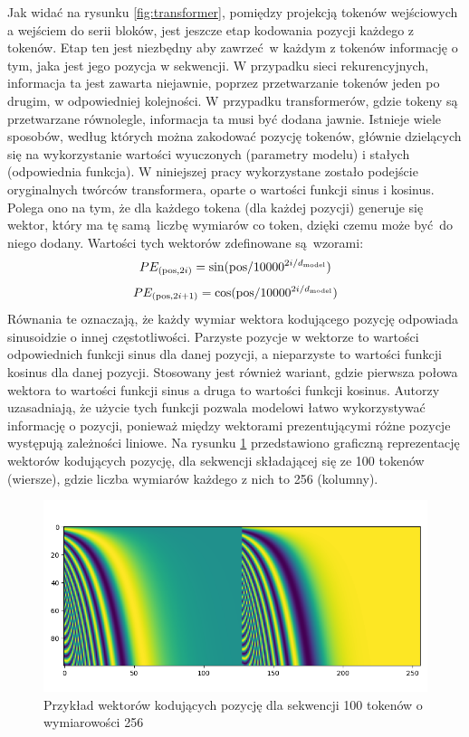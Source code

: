 Jak widać na rysunku \ref{fig:transformer}, pomiędzy projekcją tokenów wejściowych a wejściem do
serii bloków, jest jeszcze etap kodowania pozycji każdego z tokenów. Etap ten jest niezbędny aby
zawrzeć w każdym z tokenów informację o tym, jaka jest jego pozycja w sekwencji. W przypadku sieci
rekurencyjnych, informacja ta jest zawarta niejawnie, poprzez przetwarzanie tokenów jeden po drugim,
w odpowiedniej kolejności. W przypadku transformerów, gdzie tokeny są przetwarzane równolegle,
informacja ta musi być dodana jawnie.  Istnieje wiele sposobów, według których można zakodować
pozycję tokenów, głównie dzielących się na wykorzystanie wartości wyuczonych (parametry modelu) i
stałych (odpowiednia funkcja).  W niniejszej pracy wykorzystane zostało podejście oryginalnych
twórców transformera, oparte o wartości funkcji sinus i kosinus. Polega ono na tym, że dla każdego
tokena (dla każdej pozycji) generuje się wektor, który ma tę samą liczbę wymiarów co token, dzięki
czemu może być do niego dodany. Wartości tych wektorów zdefinowane są wzorami:
\begin{equation}
    PE_{(\textrm{pos},2i)} = \sin(\textrm{pos}/10000^{2i/d_{\textrm{\tiny model}}})
\end{equation}
\begin{equation}
PE_{(\textrm{pos},2i + 1)} = \cos(\textrm{pos}/10000^{2i/d_{\textrm{\tiny model}}})
\end{equation}
Równania te oznaczają, że każdy wymiar wektora kodującego pozycję odpowiada sinusoidzie o innej
częstotliwości. Parzyste pozycje w wektorze to wartości odpowiednich funkcji sinus dla danej
pozycji, a nieparzyste to wartości funkcji kosinus dla danej pozycji. Stosowany jest również
wariant, gdzie pierwsza połowa wektora to wartości funkcji sinus a druga to wartości funkcji
kosinus. Autorzy uzasadniają, że użycie tych funkcji pozwala modelowi łatwo wykorzystywać informację
o pozycji, ponieważ między wektorami prezentującymi różne pozycje występują zależności liniowe. Na
rysunku \ref{fig:positional_encoding} przedstawiono graficzną reprezentację wektorów kodujących
pozycję, dla sekwencji składającej się ze 100 tokenów (wiersze), gdzie liczba wymiarów każdego z
nich to 256 (kolumny).
\begin{figure}
    \centering
    \includegraphics[width=1.0\textwidth]{./images/positional_encoding.png}
    \caption{Przykład wektorów kodujących pozycję dla sekwencji 100 tokenów o wymiarowości 256}
    \label{fig:positional_encoding}
\end{figure}


